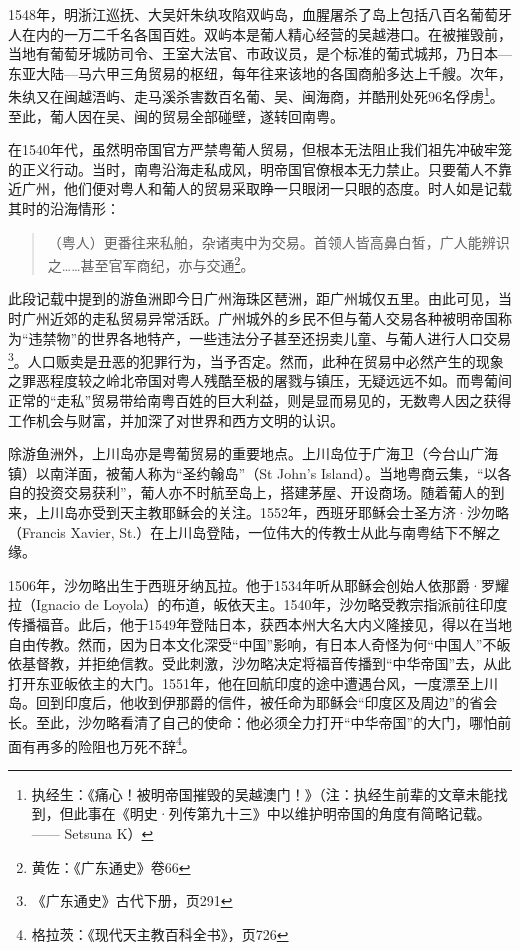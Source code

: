 1548年，明浙江巡抚、大吴奸朱纨攻陷双屿岛，血腥屠杀了岛上包括八百名葡萄牙人在内的一万二千名各国百姓。双屿本是葡人精心经营的吴越港口。在被摧毁前，当地有葡萄牙城防司令、王室大法官、市政议员，是个标准的葡式城邦，乃日本—东亚大陆—马六甲三角贸易的枢纽，每年往来该地的各国商船多达上千艘。次年，朱纨又在闽越浯屿、走马溪杀害数百名葡、吴、闽海商，并酷刑处死96名俘虏\footnote{执经生：《痛心！被明帝国摧毁的吴越澳门！》（注：执经生前辈的文章未能找到，但此事在《明史·列传第九十三》中以维护明帝国的角度有简略记载。—— Setsuna K）}。至此，葡人因在吴、闽的贸易全部碰壁，遂转回南粤。

在1540年代，虽然明帝国官方严禁粤葡人贸易，但根本无法阻止我们祖先冲破牢笼的正义行动。当时，南粤沿海走私成风，明帝国官僚根本无力禁止。只要葡人不靠近广州，他们便对粤人和葡人的贸易采取睁一只眼闭一只眼的态度。时人如是记载其时的沿海情形：

\begin{quote}

（粤人）更番往来私舶，杂诸夷中为交易。首领人皆高鼻白皙，广人能辨识之……甚至官军商纪，亦与交通\footnote{黄佐：《广东通史》卷66}。

\end{quote}

此段记载中提到的游鱼洲即今日广州海珠区琶洲，距广州城仅五里。由此可见，当时广州近郊的走私贸易异常活跃。广州城外的乡民不但与葡人交易各种被明帝国称为“违禁物”的世界各地特产，一些违法分子甚至还拐卖儿童、与葡人进行人口交易\footnote{《广东通史》古代下册，页291}。人口贩卖是丑恶的犯罪行为，当予否定。然而，此种在贸易中必然产生的现象之罪恶程度较之岭北帝国对粤人残酷至极的屠戮与镇压，无疑远远不如。而粤葡间正常的“走私”贸易带给南粤百姓的巨大利益，则是显而易见的，无数粤人因之获得工作机会与财富，并加深了对世界和西方文明的认识。

除游鱼洲外，上川岛亦是粤葡贸易的重要地点。上川岛位于广海卫（今台山广海镇）以南洋面，被葡人称为“圣约翰岛”（St John’s Island）。当地粤商云集，“以各自的投资交易获利”，葡人亦不时航至岛上，搭建茅屋、开设商场。随着葡人的到来，上川岛亦受到天主教耶稣会的关注。1552年，西班牙耶稣会士圣方济·沙勿略（Francis Xavier, St.）在上川岛登陆，一位伟大的传教士从此与南粤结下不解之缘。

1506年，沙勿略出生于西班牙纳瓦拉。他于1534年听从耶稣会创始人依那爵·罗耀拉（Ignacio de Loyola）的布道，皈依天主。1540年，沙勿略受教宗指派前往印度传播福音。此后，他于1549年登陆日本，获西本州大名大内义隆接见，得以在当地自由传教。然而，因为日本文化深受“中国”影响，有日本人奇怪为何“中国人”不皈依基督教，并拒绝信教。受此刺激，沙勿略决定将福音传播到“中华帝国”去，从此打开东亚皈依主的大门。1551年，他在回航印度的途中遭遇台风，一度漂至上川岛。回到印度后，他收到伊那爵的信件，被任命为耶稣会“印度区及周边”的省会长。至此，沙勿略看清了自己的使命：他必须全力打开“中华帝国”的大门，哪怕前面有再多的险阻也万死不辞\footnote{格拉茨：《现代天主教百科全书》，页726}。

